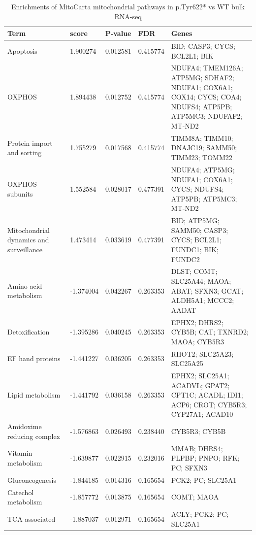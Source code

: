 \documentclass[12pt]{article}
\begin{document}
\clearpage
\begin{longtable}{p{5cm} p{2cm} p{1.5cm} p{1.5cm} p{7cm}}
    \caption{Enrichments of MitoCarta mitochondrial pathways in p.Tyr622* vs WT bulk RNA-seq} \\
    \hline
    \textbf{Term} & \textbf{score} & \textbf{P-value} & \textbf{FDR} & \textbf{Genes} \\
    \hline
    \hline
    Apoptosis & 1.900274 & 0.012581 & 0.415774 & BID; CASP3; CYCS; BCL2L1; BIK \\
    \hline
    OXPHOS & 1.894438 & 0.012752 & 0.415774 & NDUFA4; TMEM126A; ATP5MG; SDHAF2; NDUFA1; COX6A1; COX14; CYCS; COA4; NDUFS4; ATP5PB; ATP5MC3; NDUFAF2; MT-ND2 \\
    \hline
    Protein import and sorting & 1.755279 & 0.017568 & 0.415774 & TIMM8A; TIMM10; DNAJC19; SAMM50; TIMM23; TOMM22 \\
    \hline
    OXPHOS subunits & 1.552584 & 0.028017 & 0.477391 & NDUFA4; ATP5MG; NDUFA1; COX6A1; CYCS; NDUFS4; ATP5PB; ATP5MC3; MT-ND2 \\
    \hline
    Mitochondrial dynamics and surveillance & 1.473414 & 0.033619 & 0.477391 & BID; ATP5MG; SAMM50; CASP3; CYCS; BCL2L1; FUNDC1; BIK; FUNDC2 \\
    \hline
    Amino acid metabolism & -1.374004 & 0.042267 & 0.263353 & DLST; COMT; SLC25A44; MAOA; ABAT; SFXN3; GCAT; ALDH5A1; MCCC2; AADAT \\
    \hline
    Detoxification & -1.395286 & 0.040245 & 0.263353 & EPHX2; DHRS2; CYB5B; CAT; TXNRD2; MAOA; CYB5R3 \\
    \hline
    EF hand proteins & -1.441227 & 0.036205 & 0.263353 & RHOT2; SLC25A23; SLC25A25 \\
    \hline
    Lipid metabolism & -1.441792 & 0.036158 & 0.263353 & EPHX2; SLC25A1; ACADVL; GPAT2; CPT1C; ACADL; IDI1; ACP6; CROT; CYB5R3; CYP27A1; ACAD10 \\
    \hline
    Amidoxime reducing complex & -1.576863 & 0.026493 & 0.238440 & CYB5R3; CYB5B \\
    \hline
    Vitamin metabolism & -1.639877 & 0.022915 & 0.232016 & MMAB; DHRS4; PLPBP; PNPO; RFK; PC; SFXN3 \\
    \hline
    Gluconeogenesis & -1.844185 & 0.014316 & 0.165654 & PCK2; PC; SLC25A1 \\
    \hline
    Catechol metabolism & -1.857772 & 0.013875 & 0.165654 & COMT; MAOA \\
    \hline
    TCA-associated & -1.887037 & 0.012971 & 0.165654 & ACLY; PCK2; PC; SLC25A1 \\

\end{longtable}
\end{document}
